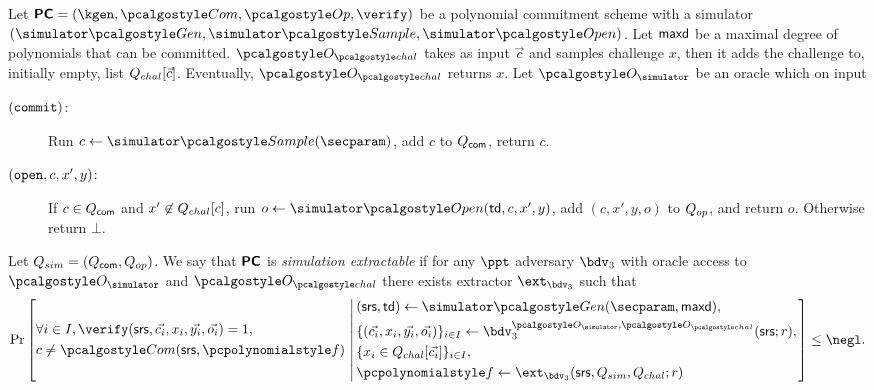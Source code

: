 \documentclass[runningheads,11pt]{llncs}
\let\spvec\vec \let\vec\accentvec
\let\vec\spvec
\begin{document}
\begin{definition}
  \label{def:se_bdv3}
  Let $\PCOM = (\kgen, \com, \op, \verify)$ be a polynomial commitment scheme with a
  simulator $(\simgen, \simsample, \simopen)$. Let $\mathsf{maxd}$ be a maximal degree of
  polynomials that can be committed.  $\oraclec$ takes as input $\vec{c}$ and samples
  challenge $x$, then it adds the challenge to, initially empty, list
  $\Qchal[\vec{c}]$. Eventually, $\oraclec$ returns $x$.  Let $\oracles$ be an oracle
  which on input
     \begin{description}
     \item[$(\mathtt{commit})$:] Run $c \gets \simsample (\secparam)$, add $c$ to
       $Q_{\mathsf{com}}$, return $c$.
     \item[$(\mathtt{open}, c, x', y)$:] If $c \in Q_{\mathsf{com}}$ and $x' \not\in {Q_{chal}}[c]$, run
       $o \gets \simopen(\td, c, x', y)$, add $(c, x', y, o)$ to $Q_{op}$, and return
       $o$. Otherwise return $\bot$.
     \end{description}
     Let $Q_{sim} = (Q_{\mathsf{com}}, Q_{op})$.  We say that $\bm{\mathsf{PC}}$ is \emph{simulation
       extractable} if for any $\ppt$ adversary $\bdv_3$ with oracle access to
     $\oracles$ and $\oraclec$ there exists extractor $\ext_{\bdv_3}$ such that
     \[
       \Pr \left[
         \begin{aligned}
           & \forall i \in I, \verify(\srs, \vec{c_i}, x_i, \vec{y_i}, \vec{o_i}) = 1, \\
           & c \neq \com(\srs, \p{f})\\
         \end{aligned}
         \,\left|\, \vphantom{
             \begin{aligned}
               & \\
               & \\
               & \\
               &
             \end{aligned}
           }
           \begin{aligned}
             & (\srs, \td) \gets \simgen(\secparam, \maxdeg),\\
             & \smallset{(\vec{c_i}, x_i, \vec{y_i}, \vec{o_i})}_{i \in I} \gets \bdv_3^{\oracles,\oraclec}(\srs; r), \\
             & \smallset{x_i \in \Qchal[\vec{c_i}]}_{i \in I}, \\
             & \p{f} \gets \ext_{\bdv_3}(\srs, \Qsim, \Qchal; r)
           \end{aligned}
         \right.\right] \leq \negl.
\]
\end{definition}
\end{document}
